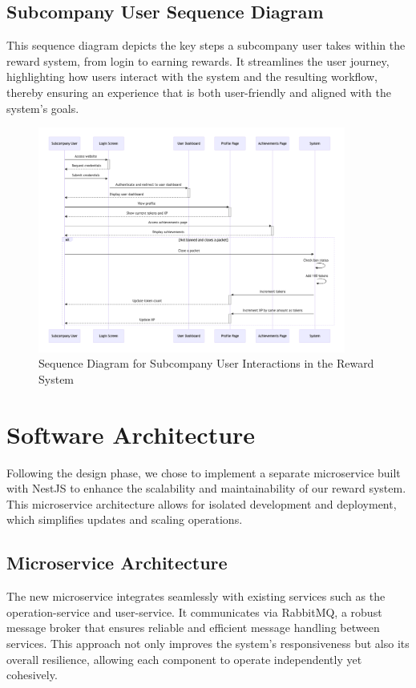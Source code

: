 \subsection{Subcompany User Sequence Diagram}
This sequence diagram depicts the key steps a subcompany user takes within the reward system, from login to earning rewards. It streamlines the user journey, highlighting how users interact with the system and the resulting workflow, thereby ensuring an experience that is both user-friendly and aligned with the system's goals.


\begin{figure}[H]
    \centering
    \includegraphics[width=0.9\textwidth]{src/assets/chapters/subbcomapny_user_sequence_diagram.png}
    \caption{Sequence Diagram for Subcompany User Interactions in the Reward System}
    \label{fig:subcompany_user_sequence_diagram}
\end{figure}

\section{Software Architecture}
Following the design phase, we chose to implement a separate microservice built with NestJS to enhance the scalability and maintainability of our reward system. This microservice architecture allows for isolated development and deployment, which simplifies updates and scaling operations.

\subsection{Microservice Architecture}
The new microservice integrates seamlessly with existing services such as the operation-service and user-service. It communicates via RabbitMQ, a robust message broker that ensures reliable and efficient message handling between services. This approach not only improves the system's responsiveness but also its overall resilience, allowing each component to operate independently yet cohesively.

